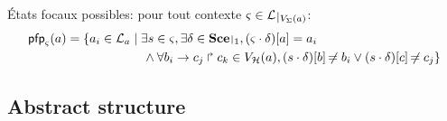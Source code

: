 \begin{comment}
==========================

Bonds possibles :
\begin{align*}
\bounceprocs_\ctx = \{ a_i \in \PHproc \mid \exists s \in \ctx, \exists \delta \in \restriction{\Sce}{k-1}, a_i \in (s \PHplay \delta) \}
\end{align*}
\end{comment}

États focaux possibles: pour tout contexte $\ctx \in \restriction{\PHl}{\Vs(a)}$:
\begin{align*}
  \pfp_\ctx(a) = \{ a_i \in \PHl_a &\mid \exists s \in \ctx, \exists \delta \in \restriction{\Sce}{1}, \PHget{(\ctx \PHplay \delta)}{a} = a_i \\
  & \quad \wedge \forall \PHhit{b_i}{c_j}{c_k} \in \Vh(a), \PHget{(s \PHplay \delta)}{b} \neq b_i \vee \PHget{(s \PHplay \delta)}{c} \neq c_j \}
\end{align*}


\begin{comment}
Séquences de bonds abstraites :
$$\BS^\wedge(P) = \{ \zeta^\wedge \mid \zeta \in \BS(P), \nexists \zeta' \in \BS(P), \zeta'^\wedge \subsetneq \zeta^\wedge \}$$
where $\zeta^\wedge = (\zeta^\wedge_A, \zeta^\wedge_B, \zeta^\wedge_{max})$ with:
\begin{itemize}
  \item $\zeta^\wedge_A = \{ \PHhitter(\zeta_n) \mid n \in \indexes{\zeta} \wedge \PHsort(\PHhitter(\zeta_n)) \neq \PHsort(P) \}$ : ens. des requis d'autres sortes (frappeurs)
  \item $\zeta^\wedge_B = \{ \PHhitter(\zeta_n) \mid n \in \indexes{\zeta} \} \cup \{ \PHtarget(\zeta_n) \mid n \in \indexes{\zeta} \}$ : ens. des processus nécessaires (à ne pas perturber)
  \item $\zeta^\wedge_{max} = \max_{n \in \indexes{\zeta}}(\prio(\zeta_n))$ : plus faible priorité
\end{itemize}
\end{comment}

\subsection{Abstract structure}

